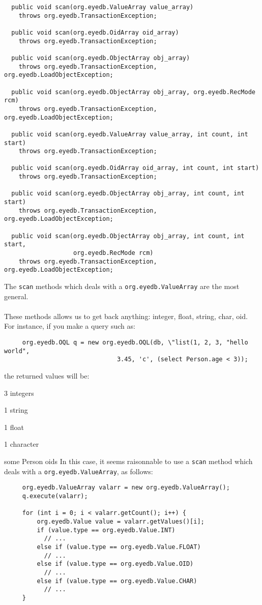 {\verbsize \begin{verbatim}
  public void scan(org.eyedb.ValueArray value_array)
    throws org.eyedb.TransactionException;

  public void scan(org.eyedb.OidArray oid_array)
    throws org.eyedb.TransactionException;

  public void scan(org.eyedb.ObjectArray obj_array)
    throws org.eyedb.TransactionException, org.eyedb.LoadObjectException;

  public void scan(org.eyedb.ObjectArray obj_array, org.eyedb.RecMode rcm)
    throws org.eyedb.TransactionException, org.eyedb.LoadObjectException;

  public void scan(org.eyedb.ValueArray value_array, int count, int start)
    throws org.eyedb.TransactionException;

  public void scan(org.eyedb.OidArray oid_array, int count, int start)
    throws org.eyedb.TransactionException;

  public void scan(org.eyedb.ObjectArray obj_array, int count, int start)
    throws org.eyedb.TransactionException, org.eyedb.LoadObjectException;

  public void scan(org.eyedb.ObjectArray obj_array, int count, int start,
                   org.eyedb.RecMode rcm)
    throws org.eyedb.TransactionException, org.eyedb.LoadObjectException;
\end{verbatim}
}
The \texttt{scan} methods which deals with a \texttt{org.eyedb.ValueArray} are
the most general.
\\
\\
These methods allows us to get back anything: integer, float, string, char,
oid.
\\
For instance, if you make a query such as:
{\verbsize \begin{verbatim}
     org.eyedb.OQL q = new org.eyedb.OQL(db, \"list(1, 2, 3, "hello world",
                               3.45, 'c', (select Person.age < 3));
\end{verbatim}
}
the returned values will be:
\bi
\item 3 integers
\item 1 string
\item 1 float
\item 1 character
\item some Person oids
\ei
In this case, it seems raisonnable to use a \texttt{scan} method which
deals with a \texttt{org.eyedb.ValueArray}, as follows:
{\verbsize \begin{verbatim}
     org.eyedb.ValueArray valarr = new org.eyedb.ValueArray();
     q.execute(valarr);   

     for (int i = 0; i < valarr.getCount(); i++) {
         org.eyedb.Value value = valarr.getValues()[i];
         if (value.type == org.eyedb.Value.INT)
           // ...
         else if (value.type == org.eyedb.Value.FLOAT)
           // ...
         else if (value.type == org.eyedb.Value.OID)
           // ...
         else if (value.type == org.eyedb.Value.CHAR)
           // ...
     }
\end{verbatim}
}
